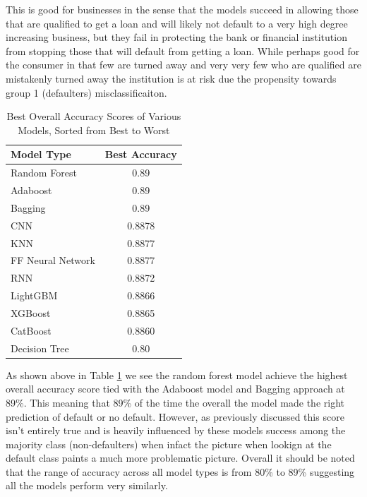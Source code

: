 \documentclass[12pt]{article}
\begin{document}
This is good for businesses in the sense that the models succeed in allowing those that are qualified to get a loan and will likely not default to a very high degree increasing business, but they fail in protecting the bank or financial institution from stopping those that will default from getting a loan. While perhaps good for the consumer in that few are turned away and very very few who are qualified are mistakenly turned away the institution is at risk due the propensity towards group 1 (defaulters) misclassificaiton.

\begin{table}[htbp]
    \centering
    \caption{Best Overall Accuracy Scores of Various Models, Sorted from Best to Worst}
    \label{tab:accuracies}
    \begin{tabular}{lc}
        \toprule
        Model Type          & Best Accuracy \\
        \midrule
        Random Forest       & 0.89 \\
        Adaboost            & 0.89 \\
        Bagging             & 0.89 \\
        CNN                 & 0.8878 \\
        KNN                 & 0.8877 \\
        FF Neural Network   & 0.8877 \\
        RNN                 & 0.8872 \\
        LightGBM            & 0.8866 \\
        XGBoost             & 0.8865 \\
        CatBoost            & 0.8860 \\
        Decision Tree       & 0.80 \\
        \bottomrule
    \end{tabular}
    \label{table:overallModelResults}
\end{table}

As shown above in Table \ref{table:overallModelResults} we see the random forest model achieve the highest overall accuracy score tied with the Adaboost model and Bagging approach at 89\%. This meaning that 89\% of the time the overall the model made the right prediction of default or no default. However, as previously discussed this score isn't entirely true and is heavily influenced by these models success among the majority class (non-defaulters) when infact the picture when lookign at the default class paints a much more problematic picture. Overall it should be noted that the range of accuracy across all model types is from 80\% to 89\% suggesting all the models perform very similarly.
\end{document}
